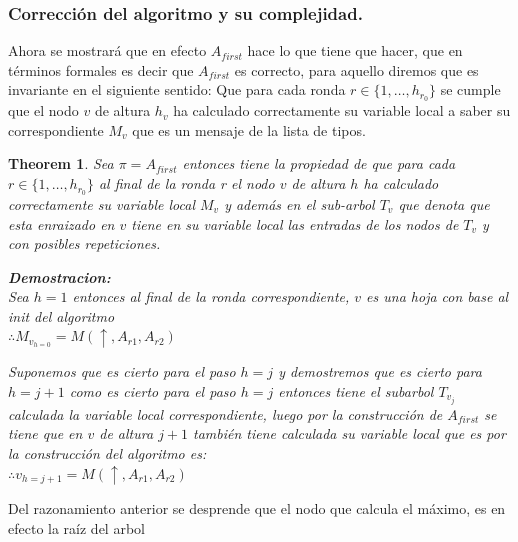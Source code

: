 \documentclass[10pt]{report}
\newtheorem{theorem}{Theorem}
\begin{document}
    \subsubsection{Corrección del algoritmo y su complejidad.}


Ahora se mostrará que en efecto $A_{first}$ hace lo que tiene que hacer, que en términos
formales es decir que $A_{first}$ es correcto, para aquello diremos que es invariante en el siguiente sentido:\newline
Que para cada ronda $ r \in \lbrace 1,\dots, h_{r_{0}} \rbrace $ se cumple que el nodo $v$ de altura $h_{v}$ ha calculado correctamente
su variable local a saber su correspondiente $M_{v}$ que es un mensaje de la lista de tipos.
\\

\begin{theorem}
Sea $ \pi = A_{first}$ entonces tiene la propiedad de que para cada $r \in \lbrace 1, \ldots, h_{r_{0}}  \rbrace $
al final de la ronda r el nodo $v$ de altura $h$ ha calculado correctamente su variable local $M_{v}$ y
además en el sub-arbol $T_{v}$ que denota que esta enraizado en $v$ tiene en su variable local las entradas de los nodos de $T_{v}$
y con posibles repeticiones.

    \textbf{Demostracion:} \\
Sea $h=1$ entonces al final de la ronda correspondiente, $v$ es una hoja con
base al init del algoritmo\\
$\therefore M_{v_{h=0}}= M(\uparrow, A_{r1}, A_{r2})$

Suponemos que es cierto para el paso $h=j$  y demostremos que es cierto para $h = j+1$
como es cierto para el paso $h =j$ entonces tiene el subarbol $T_{v_{j}}$ calculada la variable
local correspondiente, luego por la construcción de $A_{first}$ se tiene que en $v$ de altura $j+1$
también tiene calculada su variable local que es por la construcción del algoritmo es:
\\
$\therefore {v_{h = j+1}} = M(\uparrow, A_{r1}, A_{r2})$
\end{theorem}
Del razonamiento anterior se desprende que el nodo que calcula el máximo, es en efecto la raíz del arbol
\end{document}
